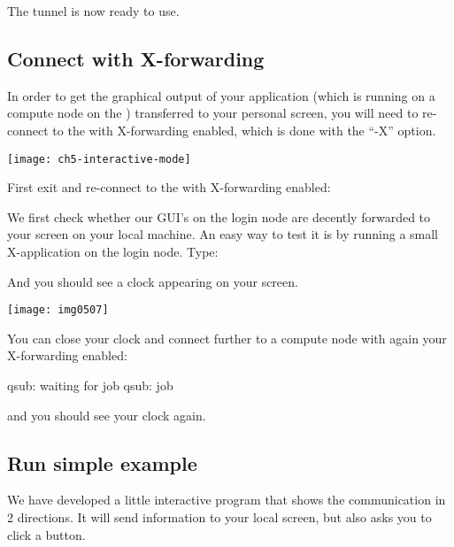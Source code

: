 The tunnel is now ready to use.
\fi

\subsection{Connect with X-forwarding}

In order to get the graphical output of your application (which is running on a
compute node on the \hpc) transferred to your personal screen, you will need
to re-connect to the \hpc with X-forwarding enabled, which is done with the
``-X'' option.

\texttt{[image: ch5-interactive-mode]}

First exit and re-connect to the \hpc with X-forwarding enabled:

\begin{prompt}
\end{prompt}

We first check whether our GUI's on the login node are decently forwarded to
your screen on your local machine. An easy way to test it is by running a small
X-application on the login node. Type:

\begin{prompt}
\end{prompt}

And you should see a clock appearing on your screen.

\texttt{[image: img0507]}

You can close your clock and connect further to a compute node with again your
X-forwarding enabled:

\begin{prompt}
qsub: waiting for job %
qsub: job %
\end{prompt}

and you should see your clock again.

\subsection{Run simple example}

We have developed a little interactive program that shows the communication in
2 directions. It will send information to your local screen, but also asks you
to click a button.

